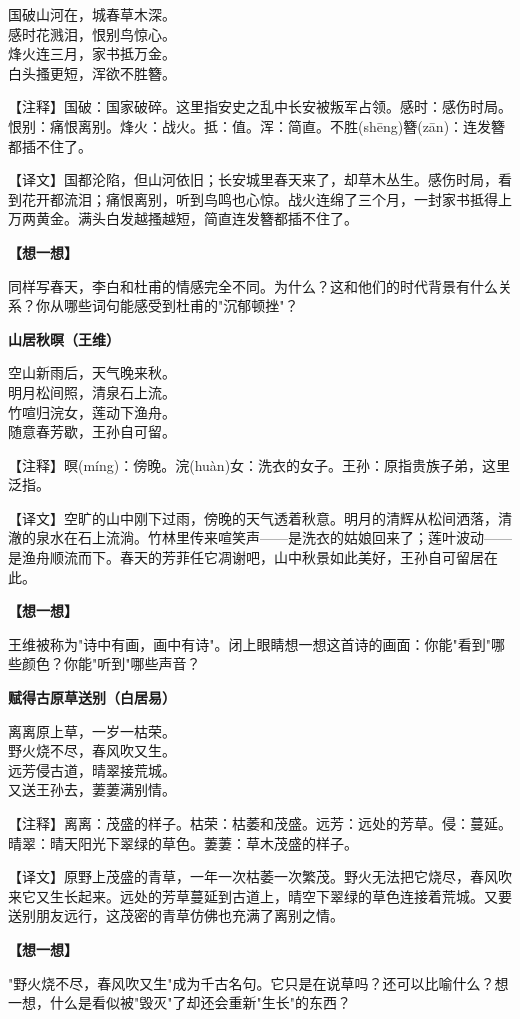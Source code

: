 \documentclass[a4paper,12pt]{ctexart}
\newcommand{\poemtitle}[1]{{\vspace{0.3cm}\noindent\textcolor{orange!80!black}{\large\bfseries #1}\par\vspace{0.1cm}}}
\newcommand{\annot}[1]{{\small\textcolor{blue!60!black}{#1}}}
\newcommand{\thinkq}{\vspace{0.2cm}\noindent\textcolor{orange!60!black}{\small\bfseries【想一想】}\par}
\begin{document}
国破山河在，城春草木深。\\
感时花溅泪，恨别鸟惊心。\\
烽火连三月，家书抵万金。\\
白头搔更短，浑欲不胜簪。

\annot{【注释】国破：国家破碎。这里指安史之乱中长安被叛军占领。感时：感伤时局。恨别：痛恨离别。烽火：战火。抵：值。浑：简直。不胜(shēng)簪(zān)：连发簪都插不住了。}

\annot{【译文】国都沦陷，但山河依旧；长安城里春天来了，却草木丛生。感伤时局，看到花开都流泪；痛恨离别，听到鸟鸣也心惊。战火连绵了三个月，一封家书抵得上万两黄金。满头白发越搔越短，简直连发簪都插不住了。}

\thinkq 同样写春天，李白和杜甫的情感完全不同。为什么？这和他们的时代背景有什么关系？你从哪些词句能感受到杜甫的"沉郁顿挫"？

\poemtitle{山居秋暝（王维）}

空山新雨后，天气晚来秋。\\
明月松间照，清泉石上流。\\
竹喧归浣女，莲动下渔舟。\\
随意春芳歇，王孙自可留。

\annot{【注释】暝(míng)：傍晚。浣(huàn)女：洗衣的女子。王孙：原指贵族子弟，这里泛指。}

\annot{【译文】空旷的山中刚下过雨，傍晚的天气透着秋意。明月的清辉从松间洒落，清澈的泉水在石上流淌。竹林里传来喧笑声——是洗衣的姑娘回来了；莲叶波动——是渔舟顺流而下。春天的芳菲任它凋谢吧，山中秋景如此美好，王孙自可留居在此。}

\thinkq 王维被称为"诗中有画，画中有诗"。闭上眼睛想一想这首诗的画面：你能"看到"哪些颜色？你能"听到"哪些声音？

\poemtitle{赋得古原草送别（白居易）}

离离原上草，一岁一枯荣。\\
野火烧不尽，春风吹又生。\\
远芳侵古道，晴翠接荒城。\\
又送王孙去，萋萋满别情。

\annot{【注释】离离：茂盛的样子。枯荣：枯萎和茂盛。远芳：远处的芳草。侵：蔓延。晴翠：晴天阳光下翠绿的草色。萋萋：草木茂盛的样子。}

\annot{【译文】原野上茂盛的青草，一年一次枯萎一次繁茂。野火无法把它烧尽，春风吹来它又生长起来。远处的芳草蔓延到古道上，晴空下翠绿的草色连接着荒城。又要送别朋友远行，这茂密的青草仿佛也充满了离别之情。}

\thinkq "野火烧不尽，春风吹又生"成为千古名句。它只是在说草吗？还可以比喻什么？想一想，什么是看似被"毁灭"了却还会重新"生长"的东西？
\end{document}
